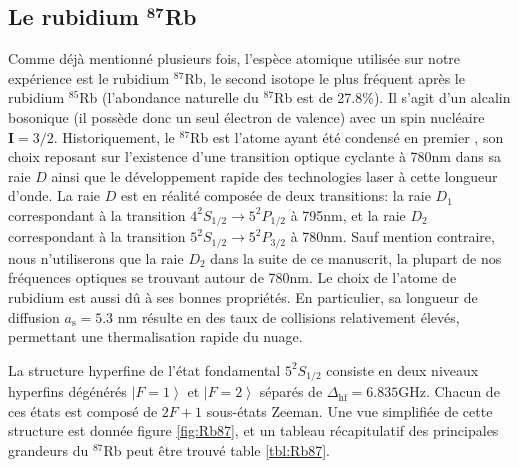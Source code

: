 \subsection{Le rubidium ${}^{\mathbf{87}}$Rb}
\label{sc:Rb87}
Comme déjà mentionné plusieurs fois, l'espèce atomique utilisée sur notre expérience est le rubidium ${}^{87}$Rb, le second isotope le plus fréquent après le rubidium ${}^{85}$Rb (l'abondance naturelle du ${}^{87}$Rb est de 27.8\%). Il s'agit d'un alcalin bosonique (il possède donc un seul électron de valence) avec un spin nucléaire $\mathbf{I}=3/2$. Historiquement, le ${}^{87}$Rb est l'atome ayant été condensé en premier \citep{anderson1995observation}, son choix reposant sur l'existence d'une transition optique cyclante à 780nm dans sa raie $D$ ainsi que le développement rapide des technologies laser à cette longueur d'onde. La raie $D$ est en réalité composée de deux transitions: la raie $D_1$ correspondant à la transition $4^2S_{1/2}\rightarrow5^2P_{1/2}$ à 795nm, et la raie $D_2$ correspondant à la transition $5^2S_{1/2}\rightarrow5^2P_{3/2}$ à 780nm. Sauf mention contraire, nous n'utiliserons que la raie $D_2$ dans la suite de ce manuscrit, la plupart de nos fréquences optiques se trouvant autour de 780nm. Le choix de l'atome de rubidium est aussi dû à ses bonnes propriétés. En particulier, sa longueur de diffusion $a_{\mathrm{s}}=5.3$ nm résulte en des taux de collisions relativement élevés, permettant une thermalisation rapide du nuage. 

La structure hyperfine de l'état fondamental $5^2S_{1/2}$ consiste en deux niveaux hyperfins dégénérés $\left| F=1 \right\rangle$ et $\left| F=2 \right\rangle$ séparés de $\Delta_{\mathrm{hf}}=6.835$GHz. Chacun de ces états est composé de $2F+1$ sous-états Zeeman. Une vue simplifiée de cette structure est donnée figure \ref{fig:Rb87}, et un tableau récapitulatif des principales grandeurs du ${}^{87}$Rb peut être trouvé table \ref{tbl:Rb87}.

